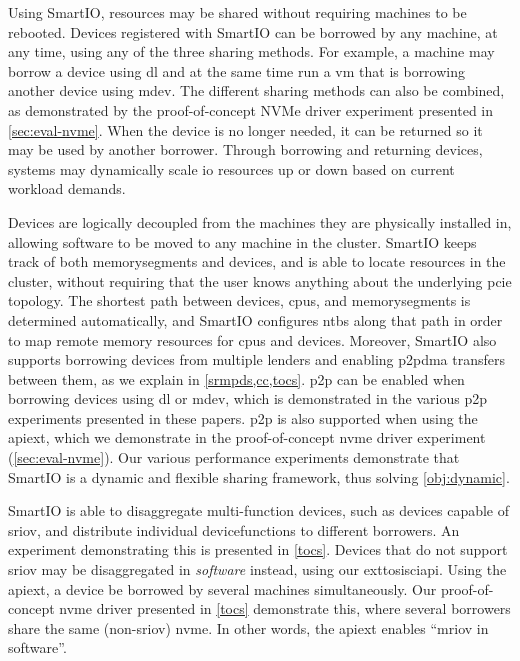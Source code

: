 \objdynamic*%
%
%
%
Using SmartIO, resources may be shared without requiring machines to be rebooted.
%
Devices registered with SmartIO can be borrowed by any machine, at any time, using any of the three sharing methods.
%
For example, a machine may borrow a device using \gls{dl} and at the same time run a \gls{vm} that is borrowing another device using \gls{mdev}.
%
The different sharing methods can also be combined, as demonstrated by the proof-of-concept NVMe driver experiment presented in \cref{sec:eval-nvme}.
%
When the device is no longer needed, it can be returned so it may be used by another \gls{borrower}.
%
Through borrowing and returning devices, systems may dynamically scale \gls{io} resources up or down based on current workload demands.



Devices are logically decoupled from the machines they are physically installed in, allowing software to be moved to any machine in the cluster.
%
SmartIO keeps track of both \glspl{memorysegment} and devices, and is able to locate resources in the cluster, without requiring that the user knows anything about the underlying \gls{pcie} topology.
%
The shortest path between devices, \glspl{cpu}, and \glspl{memorysegment} is determined automatically, and SmartIO configures \glspl{ntb} along that path in order to map remote memory resources for \glspl{cpu} and devices.
%
Moreover, SmartIO also supports borrowing devices from multiple \glspl{lender} and enabling \gls{p2pdma} transfers between them, as we explain in \cref{srmpds,cc,tocs}.
%
\Gls{p2p} can be enabled when borrowing devices using \gls{dl} or \gls{mdev}, which is demonstrated in the various \gls{p2p} experiments presented in these papers.
%
\Gls{p2p} is also supported when using the \gls{apiext}, which we demonstrate in the proof-of-concept \gls{nvme} driver experiment (\cref{sec:eval-nvme}).
%
Our various performance experiments demonstrate that SmartIO is a dynamic and flexible sharing framework, thus solving \cref*{obj:dynamic}.




\objdisaggregation*%
%
SmartIO is able to \gls{disaggregate} multi-function devices, such as devices capable of \gls{sriov}, and distribute individual \glspl{devicefunction} to different \glspl{borrower}.
%
An experiment demonstrating this is presented in \cref{tocs}.
%
Devices that do not support \gls{sriov} may be \gls{disaggregated} in \emph{software} instead, using our \gls{exttosisciapi}.
%
Using the \gls{apiext}, a device be borrowed by several machines simultaneously.
%
Our proof-of-concept \gls{nvme} driver presented in \cref{tocs} demonstrate this, where several \glspl{borrower} share the same (non-\gls{sriov}) \gls{nvme}.
%
In other words, the \gls{apiext} enables ``\gls{mriov} in software''.



